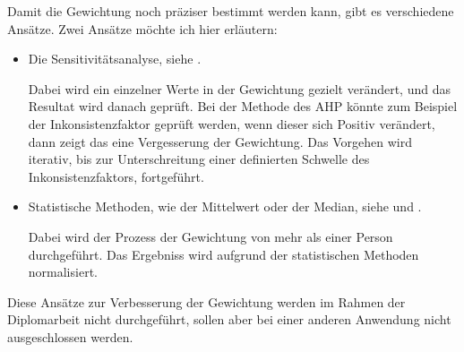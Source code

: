   Damit die Gewichtung noch präziser bestimmt werden kann, gibt es verschiedene
  Ansätze. Zwei Ansätze möchte ich hier erläutern:
  
  \begin{itemize}
    \item Die Sensitivitätsanalyse, siehe \cite{Sensitivitaetsanalyse}.
    
    Dabei wird ein einzelner Werte in der Gewichtung gezielt verändert, und das
    Resultat wird danach geprüft. Bei der Methode des \ac{AHP} könnte zum
    Beispiel der Inkonsistenzfaktor geprüft werden, wenn dieser sich Positiv
    verändert, dann zeigt das eine Vergesserung der Gewichtung. Das Vorgehen
    wird iterativ, bis zur Unterschreitung einer definierten Schwelle des
    Inkonsistenzfaktors, fortgeführt.
    
    \item Statistische Methoden, wie der Mittelwert oder der Median, siehe
    \cite{Median} und \cite{Mittelwert}.
    
    Dabei wird der Prozess der Gewichtung von mehr als einer Person
    durchgeführt. Das Ergebniss wird aufgrund der statistischen Methoden
    normalisiert.
  \end{itemize}
  
  Diese Ansätze zur Verbesserung der Gewichtung werden im Rahmen der
  Diplomarbeit nicht durchgeführt, sollen aber bei einer anderen Anwendung nicht
  ausgeschlossen werden.
